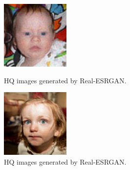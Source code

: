 \documentclass{article}
\begin{document}
\begin{figure}[htbp]
    \centering
    \begin{minipage}{0.45\textwidth}
        \centering
        \includegraphics[width=\textwidth]{imgs/00328.png}
        \caption{HQ images generated by Real-ESRGAN.}
        \label{fig:image3}
    \end{minipage}\hfill
    \begin{minipage}{0.45\textwidth}
        \centering
        \includegraphics[width=\textwidth]{imgs/00386.png}
        \caption{HQ images generated by Real-ESRGAN.}
        \label{fig:image4}
    \end{minipage}
\end{figure}
\end{document}

